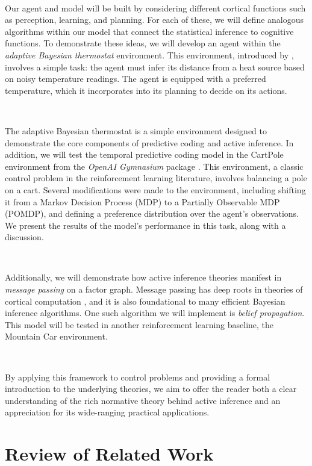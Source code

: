 \documentclass{article}
\begin{document}
\

Our agent and model will be built by considering different cortical functions such as perception, learning, and planning. For each of these, we will define analogous algorithms within our model that connect the statistical inference to cognitive functions. To demonstrate these ideas, we will develop an agent within the \textit{adaptive Bayesian thermostat} environment. This environment, introduced by \citet{buckley2017free}, involves a simple task: the agent must infer its distance from a heat source based on noisy temperature readings. The agent is equipped with a preferred temperature, which it incorporates into its planning to decide on its actions.

\

The adaptive Bayesian thermostat is a simple environment designed to demonstrate the core components of predictive coding and active inference. In addition, we will test the temporal predictive coding model in the CartPole environment from the \textit{OpenAI Gymnasium} package \citep{towers2024gymnasium}. This environment, a classic control problem in the reinforcement learning literature, involves balancing a pole on a cart. Several modifications were made to the environment, including shifting it from a Markov Decision Process (MDP) to a Partially Observable MDP (POMDP), and defining a preference distribution over the agent's observations. We present the results of the model’s performance in this task, along with a discussion.

\

Additionally, we will demonstrate how active inference theories manifest in \textit{message passing} on a factor graph. Message passing has deep roots in theories of cortical computation \citep{parr2019neuronal}, and it is also foundational to many efficient Bayesian inference algorithms. One such algorithm we will implement is \textit{belief propagation}. This model will be tested in another reinforcement learning baseline, the Mountain Car environment.

\

By applying this framework to control problems and providing a formal introduction to the underlying theories, we aim to offer the reader both a clear understanding of the rich normative theory behind active inference and an appreciation for its wide-ranging practical applications.

\section{Review of Related Work}
\end{document}

